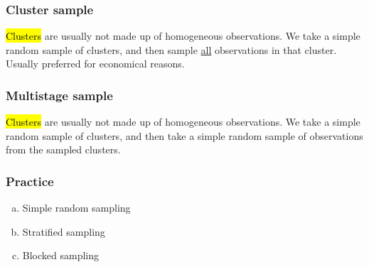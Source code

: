 \documentclass[slidestop,compress,mathserif]{beamer}
\begin{document}

\begin{frame}
\frametitle{Cluster sample}

\hl{Clusters} are usually not made up of homogeneous observations. We take a simple random sample of clusters, and then sample \underline{all} observations in that cluster. Usually preferred for economical reasons.

\begin{center}
\end{center}

\end{frame}


\begin{frame}
\frametitle{Multistage sample}

\hl{Clusters} are usually not made up of homogeneous observations.  We take a simple random sample of clusters, and then take a simple random sample of observations from the sampled clusters.

\begin{center}
\end{center}

\end{frame}


\begin{frame}
\frametitle{Practice}


\begin{enumerate}[(a)]
\item Simple random sampling
\item Stratified sampling
\item Blocked sampling
\end{enumerate}

\end{frame}
\end{document}
